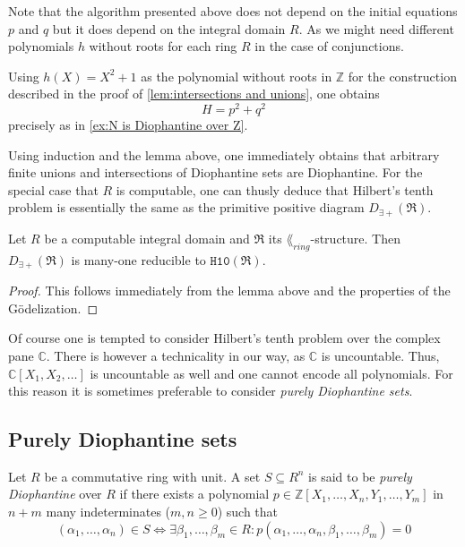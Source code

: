 Note that the algorithm presented above does not depend on the initial equations
\(p\) and \(q\) but it does depend on the integral domain \(R\). As we might
need different polynomials \(h\) without roots for each ring \(R\) in the case
of conjunctions.

\begin{rem}
  Using \(h(X) = X^2 + 1\) as the polynomial without roots in \(ℤ\) for the
  construction described in the proof of \cref{lem:intersections and unions},
  one obtains
  \[
    H = p^2 + q^2
  \]
  precisely as in \cref{ex:N is Diophantine over Z}.
\end{rem}

Using induction and the lemma above, one immediately obtains that arbitrary
finite unions and intersections of Diophantine sets are Diophantine. For the
special case that \(R\) is computable, one can thusly deduce that Hilbert's
tenth problem is essentially the same as the primitive positive diagram
\(D_{∃+}(\mathfrak{R})\).

\begin{cor}
  Let \(R\) be a computable integral domain and \(\mathfrak{R}\) its
  \(\lang_{ring}\)-structure. Then \(D_{∃+}(\mathfrak{R})\) is many-one
  reducible to \(\mathtt{H10}(\mathfrak{R})\).
\end{cor}
\begin{proof}
  This follows immediately from the lemma above and the properties of the
  Gödelization.
\end{proof}

Of course one is tempted to consider Hilbert's tenth problem over the complex
pane \(ℂ\). There is however a technicality in our way, as \(ℂ\) is uncountable.
Thus, \(ℂ[X_1, X_2, …]\) is uncountable as well and one cannot encode all
polynomials. For this reason it is sometimes preferable to consider \emph{purely
Diophantine sets}.

\subsection{Purely Diophantine sets}

\begin{defin}
    Let \(R\) be a commutative ring with unit. A set \(S \subseteq R^n\) is said to
    be \emph{purely Diophantine} over \(R\) if there exists a polynomial \(p ∈
    ℤ[X_1,…,X_n, Y_1,…,Y_m]\) in \(n + m\) many indeterminates (\(m,n ≥ 0\)) such
    that
    \[
      (α_1,…,α_n) ∈ S ⇔
      ∃ β_1,…,β_m ∈ R: p(α_1,…,α_n,β_1,…,β_m) = 0
    \]
\end{defin}

